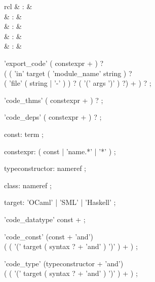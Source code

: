 \begin{isabellebody}
\begin{isamarkuptext}
\begin{matharray}{rcl}
    \hypertarget{command.HOL.code-include}{\hyperlink{command.HOL.code-include}{\mbox{}}} & : &  \\
    \hypertarget{command.HOL.code-modulename}{\hyperlink{command.HOL.code-modulename}{\mbox{}}} & : &  \\
    \hypertarget{command.HOL.code-exception}{\hyperlink{command.HOL.code-exception}{\mbox{}}} & : &  \\
    \hypertarget{command.HOL.print-codesetup}{\hyperlink{command.HOL.print-codesetup}{\mbox{}}}\isa{{\isachardoublequote}\isactrlsup {\isacharasterisk}{\isachardoublequote}} & : &  \\
    \hypertarget{attribute.HOL.code}{\hyperlink{attribute.HOL.code}{\mbox{}}} & : & \isaratt \\
  \end{matharray}

  \begin{rail}
    'export\_code' ( constexpr + ) ? \\
      ( ( 'in' target ( 'module\_name' string ) ? \\
        ( 'file' ( string | '-' ) ) ? ( '(' args ')' ) ?) + ) ?
    ;

    'code\_thms' ( constexpr + ) ?
    ;

    'code\_deps' ( constexpr + ) ?
    ;

    const: term
    ;

    constexpr: ( const | 'name.*' | '*' )
    ;

    typeconstructor: nameref
    ;

    class: nameref
    ;

    target: 'OCaml' | 'SML' | 'Haskell'
    ;

    'code\_datatype' const +
    ;

    'code\_const' (const + 'and') \\
      ( ( '(' target ( syntax ? + 'and' ) ')' ) + )
    ;

    'code\_type' (typeconstructor + 'and') \\
      ( ( '(' target ( syntax ? + 'and' ) ')' ) + )
    ;


\end{rail}
\end{isamarkuptext}
\end{isabellebody}
